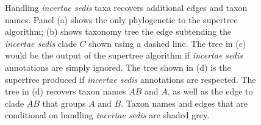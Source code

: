 \documentclass[english]{article}
\begin{document}
\begin{figure}
\hfill{}

\caption{\label{fig:Handling-incertae-sedis}Handling \emph{incertae sedis
}taxa recovers additional edges and taxon names.
Panel (a) shows the only phylogenetic to the supertree algorithm;
(b) shows taxonomy tree the edge subtending the \emph{incertae sedis}
clade $C$ shown using a dashed line.
The tree in (c) would be the output of the supertree algorithm
if \emph{incertae sedis} annotations are simply ignored.
The tree shown in (d) is the supertree produced 
if \emph{incertae sedis} annotations are respected.
The tree in (d) recovers taxon names $AB$ and $A$, as well as the edge to clade $AB$
that groups $A$ and $B$. Taxon names and edges that are conditional on handling
\emph{incertae sedis} are shaded grey. 
}

\end{figure}
\end{document}
